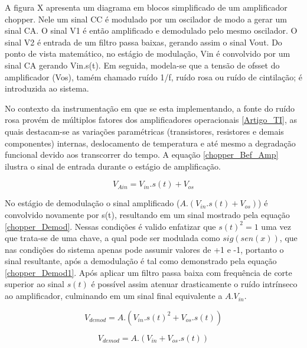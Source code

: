 \documentclass[oneside,openright,12pt]{ufsm_2021} %
\begin{document}
            \par A figura X apresenta um diagrama em blocos simplificado de um amplificador chopper. Nele um sinal CC é modulado por um oscilador de modo a gerar um sinal CA. O sinal V1 é então amplificado e demodulado pelo mesmo oscilador. O sinal V2 é entrada de um filtro passa baixas, gerando assim o sinal Vout. Do ponto de vista matemático, no estágio de modulação, Vin é convolvido por um sinal CA gerando Vin.s(t). Em seguida, modela-se que a tensão de ofsset do amplificador (Vos), tamém chamado ruído 1/f, ruído rosa ou ruído de cintilação; é introduzida ao sistema. 
            \par No contexto da instrumentação em que se esta implementando, a fonte do ruído rosa provém de múltiplos fatores dos amplificadores operacionais \ref{Artigo_TI}, as quais destacam-se as variações paramétricas (transistores, resistores e demais componentes) internas, deslocamento de temperatura e até mesmo a degradação funcional devido aos transcorrer do tempo. A equação \ref{chopper_Bef_Amp} ilustra o sinal de entrada durante o estágio de amplificação.

            \begin{equation}
            \label{eq:chopper_Bef_Amp}
                V_{Ain}=V_{in}.s(t) + V_{os}
            \end{equation}

            \par No estágio de demodulação o sinal amplificado ($A.(V_{in}.s(t) + V_{os})$) é convolvido novamente por s(t), resultando em um sinal mostrado pela equação \ref{chopper_Demod}. Nessas condições é valido enfatizar que $s(t)^2=1$ uma vez que trata-se de uma chave, a qual pode ser modulada como $sig(sen(x))$, que nas condições do sistema apenas pode assumir valores de +1 e -1, portanto o sinal resultante, após a demodulação é tal como demonstrado pela equação \ref{chopper_Demod1}. Após aplicar um filtro passa baixa com frequência de corte superior ao sinal $s(t)$ é possível assim atenuar drasticamente o ruído intrínseco ao amplificador, culminando em um sinal final equivalente a $A.V_{in}$.

            \begin{equation}
            \label{eq:chopper_Demod}
                V_{demod}=A.(V_{in}.s(t)^2+ V_{os}.s(t))
            \end{equation}

            \begin{equation}
            \label{eq:chopper_Demod1}
                V_{demod}=A.(V_{in}+ V_{os}.s(t))
            \end{equation}
\end{document}
